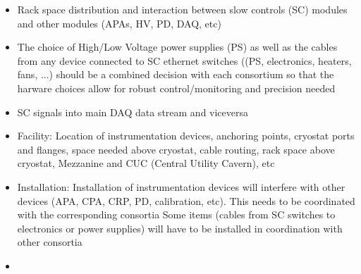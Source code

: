 \begin{itemize}
\item Rack space distribution and interaction between slow controls (SC) modules and other modules (APAs, HV, PD, DAQ, etc)
\item The choice of High/Low Voltage power supplies (PS) as well as the cables from any device connected to SC ethernet switches
  ((PS, electronics, heaters, fans, ...) should be a combined decision with each consortium so that the harware choices 
  allow for robust control/monitoring and precision needed 
\item SC signals into main DAQ data stream and viceversa
\item Facility: Location of instrumentation devices, anchoring points, cryostat ports and flanges, space needed above cryostat, cable routing, rack space above cryostat, Mezzanine and CUC (Central Utility Cavern), etc 
\item Installation: Installation of instrumentation devices will interfere with other devices (APA, CPA, CRP, PD, calibration, etc). This needs to be coordinated with the corresponding consortia
  Some items (cables from SC switches to electronics or power supplies) will have to be installed in coordination with other consortia
\item 
\end{itemize}


